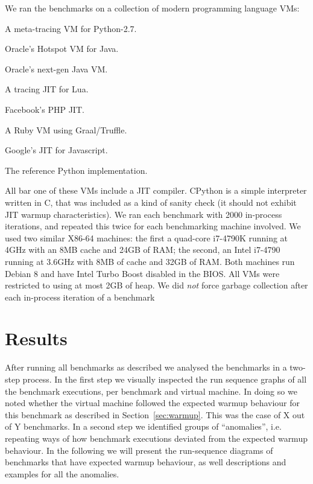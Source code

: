 \documentclass[10pt,preprint]{sigplanconf}
\begin{document}
We ran the benchmarks on a collection of modern programming language VMs:
\begin{description*}
\item[PyPy-2.6.0] A meta-tracing VM for Python-2.7.
\item[Java8-b132] Oracle's Hotspot VM for Java.
\item[Graal-dev~\footnote{Graal version 9dafd1dc5ff9.}] Oracle's next-gen
Java VM.
\item[LuaJIT-2.0.4] A tracing JIT for Lua.
\item[HHVM] Facebook's PHP JIT.
\item[JRuby/Truffle-dev~\footnote{JRuby/Truffle version 7b4cee81891f.}] A
Ruby VM using Graal/Truffle.
\item[V8-4.5.38] Google's JIT for Javascript.
\item[CPython-2.7.10] The reference Python implementation.
\end{description*}

All bar one of
these VMs include a JIT compiler. CPython is a simple interpreter written in C,
that was included as a kind of sanity check (it should not exhibit JIT warmup
characteristics). We ran each benchmark with 2000 in-process iterations,
and repeated this twice for each benchmarking machine involved. We used two
similar X86-64 machines: the first a quad-core i7-4790K running at 4GHz with
an 8MB cache and 24GB of RAM; the second, an Intel i7-4790 running at 3.6GHz
with 8MB of cache and 32GB of RAM. Both machines run Debian 8 and have Intel
Turbo Boost disabled in the BIOS. All VMs were restricted to using at most
2GB of heap. We did \emph{not} force garbage collection after each
in-process iteration of a benchmark 


\section{Results}
\label{sec:Results}

After running all benchmarks as described we analysed the benchmarks in a
two-step process. In the first step we visually inspected the run sequence
graphs of all the benchmark executions, per benchmark and virtual machine. In
doing so we noted whether the virtual machine followed the expected warmup
behaviour for this benchmark as described in Section~\ref{sec:warmup}. This was
the case of  X out of Y benchmarks. In a second step we
identified groups of ``anomalies'', i.e. repeating ways of how benchmark
executions deviated from the expected warmup behaviour. In the following we will
present the run-sequence diagrams of benchmarks that have expected warmup
behaviour, as well descriptions and examples for all the anomalies.
\end{document}
